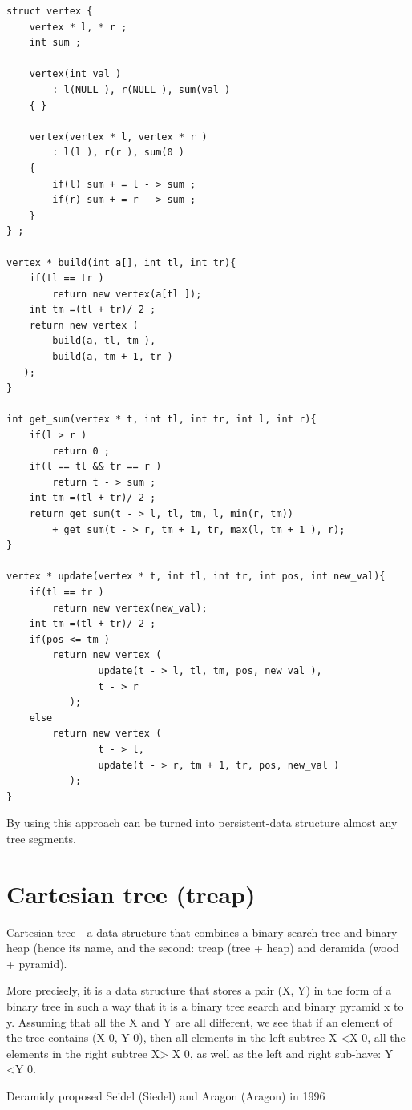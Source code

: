 \begin{verbatim}
struct vertex {
    vertex * l, * r ;
    int sum ;
 
    vertex(int val )
        : l(NULL ), r(NULL ), sum(val )
    { }
 
    vertex(vertex * l, vertex * r )
        : l(l ), r(r ), sum(0 )
    {
        if(l) sum + = l - > sum ;
        if(r) sum + = r - > sum ;
    }
} ;
 
vertex * build(int a[], int tl, int tr){
    if(tl == tr )
        return new vertex(a[tl ]);
    int tm =(tl + tr)/ 2 ;
    return new vertex (
        build(a, tl, tm ),
        build(a, tm + 1, tr )
   );
}
 
int get_sum(vertex * t, int tl, int tr, int l, int r){
    if(l > r )
        return 0 ;
    if(l == tl && tr == r )
        return t - > sum ;
    int tm =(tl + tr)/ 2 ;
    return get_sum(t - > l, tl, tm, l, min(r, tm))
        + get_sum(t - > r, tm + 1, tr, max(l, tm + 1 ), r);
}
 
vertex * update(vertex * t, int tl, int tr, int pos, int new_val){
    if(tl == tr )
        return new vertex(new_val);
    int tm =(tl + tr)/ 2 ;
    if(pos <= tm )
        return new vertex (
                update(t - > l, tl, tm, pos, new_val ),
                t - > r
           );
    else
        return new vertex (
                t - > l,
                update(t - > r, tm + 1, tr, pos, new_val )
           );
} 
\end{verbatim}
By using this approach can be turned into persistent-data structure almost any tree segments.

\section{ Cartesian tree (treap) }
Cartesian tree - a data structure that combines a binary search tree and binary heap (hence its name, and the second: treap (tree + heap) and deramida (wood + pyramid).

More precisely, it is a data structure that stores a pair (X, Y) in the form of a binary tree in such a way that it is a binary tree search and binary pyramid x to y. Assuming that all the X and Y are all different, we see that if an element of the tree contains (X 0, Y 0), then all elements in the left subtree X <X 0, all the elements in the right subtree X> X 0, as well as the left and right sub-have: Y <Y 0.

Deramidy proposed Seidel (Siedel) and Aragon (Aragon) in 1996


